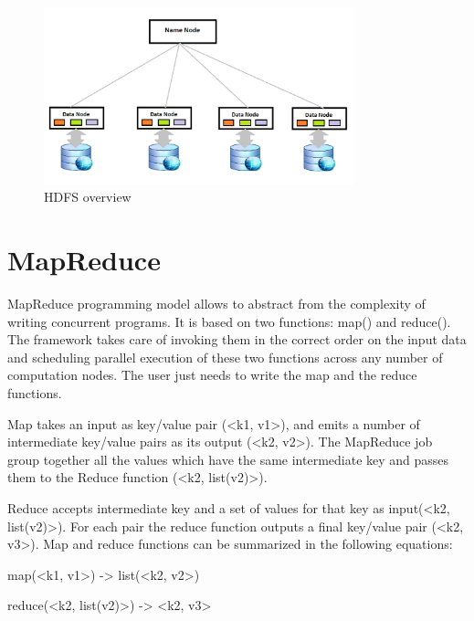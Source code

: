 \begin{figure}[htb]
\centering
\includegraphics[width=0.8\textwidth]{./images/hdfs.png}
\caption{HDFS overview} \label{fig:hdfs}
\end{figure}


\section{MapReduce}

MapReduce programming model allows to abstract from the complexity of writing concurrent programs. It is based on two functions: map() and reduce(). The framework takes care of invoking them in the correct order on the input data and scheduling parallel execution of these two functions across any number of computation nodes. The user just needs to write the map and the reduce functions.
\par
Map takes an input as key/value pair (\textless k1, v1\textgreater), and emits a number of intermediate key/value pairs as its output (\textless k2, v2\textgreater). The MapReduce job group together all the values which have the same intermediate key and passes them to the Reduce function (\textless k2, list(v2)\textgreater).
\par
Reduce accepts intermediate key and a set of values for that key as input(\textless k2, list(v2)\textgreater). For each pair the reduce function outputs a final key/value pair (\textless k2, v3\textgreater). Map and reduce functions can be summarized in the following equations:

\centerline{map(\textless k1, v1\textgreater) \:\:  -\textgreater \:\:   list(\textless k2, v2\textgreater)}
\par
\centerline{reduce(\textless k2, list(v2)\textgreater) \:\:  -\textgreater \:\:  \textless k2, v3\textgreater}

\bigskip
\par


